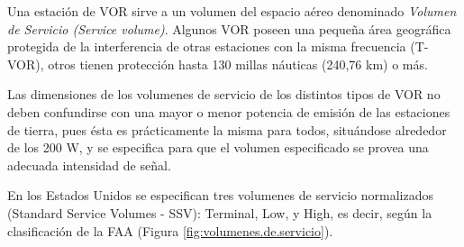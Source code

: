Una estaci\'on de VOR sirve a un volumen del espacio a\'ereo denominado \emph{Volumen de Servicio (Service volume)}. Algunos VOR poseen una peque\~na \'area geogr\'afica protegida de la interferencia de otras estaciones con la misma frecuencia (T-VOR), otros tienen protecci\'on hasta 130 millas n\'auticas (240,76 km) o m\'as. 

Las dimensiones de los volumenes de servicio de los distintos tipos de VOR  no deben confundirse con una mayor o menor potencia de emisi\'on de las estaciones de tierra, pues \'esta es pr\'acticamente la misma para todos, situ\'andose alrededor  de los 200 W, y se especifica para que el volumen especificado se provea una adecuada intensidad de se\~nal.

En los Estados Unidos se especifican tres volumenes de servicio normalizados (Standard Service Volumes - SSV): Terminal, Low, y High, es decir, seg\'un la clasificaci\'on de la FAA (Figura \ref{fig:volumenes.de.servicio}).




